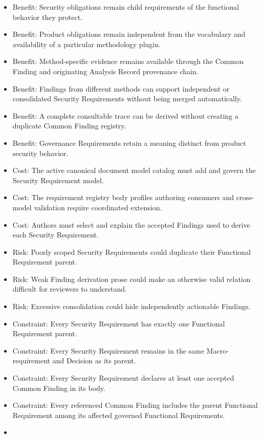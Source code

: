 \documentclass[
  10pt,
]{article}
\providecommand{\tightlist}{%
  \setlength{\itemsep}{0pt}\setlength{\parskip}{0pt}}
\begin{document}
\begin{itemize}
\tightlist
\item
  Benefit: Security obligations remain child requirements of the
  functional behavior they protect.
\item
  Benefit: Product obligations remain independent from the vocabulary
  and availability of a particular methodology plugin.
\item
  Benefit: Method-specific evidence remains available through the Common
  Finding and originating Analysis Record provenance chain.
\item
  Benefit: Findings from different methods can support independent or
  consolidated Security Requirements without being merged automatically.
\item
  Benefit: A complete consultable trace can be derived without creating
  a duplicate Common Finding registry.
\item
  Benefit: Governance Requirements retain a meaning distinct from
  product security behavior.
\item
  Cost: The active canonical document model catalog must add and govern
  the Security Requirement model.
\item
  Cost: The requirement registry body profiles authoring consumers and
  cross-model validation require coordinated extension.
\item
  Cost: Authors must select and explain the accepted Findings used to
  derive each Security Requirement.
\item
  Risk: Poorly scoped Security Requirements could duplicate their
  Functional Requirement parent.
\item
  Risk: Weak Finding derivation prose could make an otherwise valid
  relation difficult for reviewers to understand.
\item
  Risk: Excessive consolidation could hide independently actionable
  Findings.
\item
  Constraint: Every Security Requirement has exactly one Functional
  Requirement parent.
\item
  Constraint: Every Security Requirement remains in the same
  Macro-requirement and Decision as its parent.
\item
  Constraint: Every Security Requirement declares at least one accepted
  Common Finding in its body.
\item
  Constraint: Every referenced Common Finding includes the parent
  Functional Requirement among its affected governed Functional
  Requirements.
\item

\end{itemize}
\end{document}
